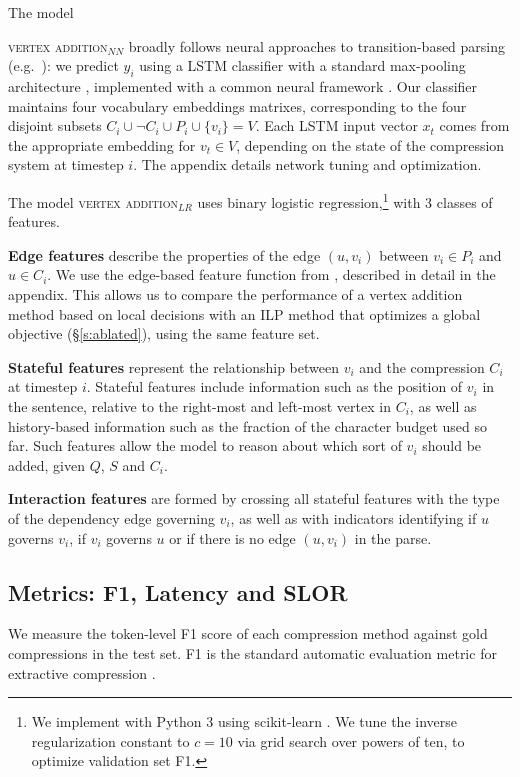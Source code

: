 \documentclass[11pt,a4paper]{article}
\begin{document}
The model {\textsc{vertex addition}$_{NN}$ broadly follows neural approaches to transition-based parsing (e.g.\ \citet{D14-1082}): we predict $y_i$ using a LSTM classifier with a standard max-pooling architecture \cite{D17-1070}, implemented with a common neural framework \cite{Gardner2017AllenNLP}. Our classifier maintains four vocabulary embeddings matrixes, corresponding to the four disjoint subsets $C_i \cup \neg C_i \cup P_i \cup \{v_i\} = V$. Each LSTM input vector $x_t$ comes from the appropriate embedding for $v_t \in V$, depending on the state of the compression system at timestep $i$. The appendix details network tuning and  optimization.

The model \textsc{vertex addition}$_{LR}$ uses binary logistic regression,\footnote{We implement with Python 3 using scikit-learn \cite{Pedregosa:2011:SML:1953048.2078195}. We tune the inverse regularization constant to $c=10$ via grid search over powers of ten, to optimize validation set F1.} with 3 classes of features.

\textbf{Edge features} describe the properties of the edge $(u,v_i)$ between $v_i \in P_i$ and $u \in C_i$. We use the edge-based feature function from \citet{filippova2013overcoming}, described in detail in the appendix. This allows us to compare the performance of a vertex addition method based on local decisions with an ILP method that optimizes a global objective (\S \ref{s:ablated}), using the same feature set.

\textbf{Stateful features} represent the relationship between $v_i$ and the compression $C_i$ at timestep $i$. Stateful features include information such as the position of $v_i$ in the sentence, relative to the right-most and left-most vertex in $C_i$, as well as history-based information such as the fraction of the character budget used so far. Such features allow the model to reason about which sort of $v_i$ should be added, given $Q$, $S$ and $C_i$.

\textbf{Interaction features} are formed by crossing all stateful features with the type of the dependency edge governing $v_i$, as well as with indicators identifying if $u$ governs $v_i$, if $v_i$ governs $u$ or if there is no edge $(u,v_i)$ in the parse.

\subsection{Metrics: F1, Latency and SLOR}\label{s:f1}
We measure the token-level F1 score of each compression method against gold compressions in the test set. F1 is the standard automatic evaluation metric for extractive compression \cite{filippova2015sentence,Klerke2016ImprovingSC,Wang2017CanSH}. 

}
\end{document}
